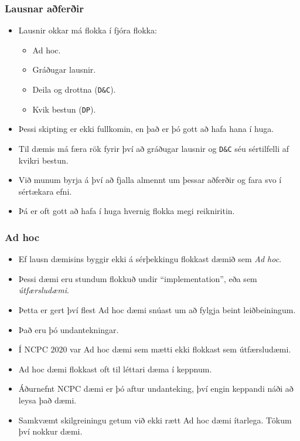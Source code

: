\documentclass{beamer}
\newcommand\env[2]
{
	\begin{#1}
	#2
	\end{#1}
}
\begin{document}
\env{frame}
{
	\frametitle{Lausnar aðferðir}
	\env{itemize}
	{
		\item<1-> Lausnir okkar má flokka í fjóra flokka:
		\env{itemize}
		{
			\item<2-> Ad hoc.
			\item<3-> Gráðugar lausnir.
			\item<4-> Deila og drottna (\texttt{D\&C}).
			\item<5-> Kvik bestun (\texttt{DP}).
		}
		\item<6-> Þessi skipting er ekki fullkomin, en það er þó gott að hafa hana í huga.
		\item<7-> Til dæmis má færa rök fyrir því að gráðugar lausnir og \texttt{D\&C} séu sértilfelli af kvikri bestun.
		\item<8-> Við munum byrja á því að fjalla almennt um þessar aðferðir og fara svo í sértækara efni.
		\item<9-> Þá er oft gott að hafa í huga hvernig flokka megi reikniritin.
	}
}

\env{frame}
{
	\frametitle{Ad hoc}
	\env{itemize}
	{
		\item<1-> Ef lausn dæmisins byggir ekki á sérþekkingu flokkast dæmið sem \emph{Ad hoc}.
		\item<2-> Þessi dæmi eru stundum flokkuð undir ``implementation'', eða sem \emph{útfærsludæmi}.
		\item<3-> Þetta er gert því flest Ad hoc dæmi snúast um að fylgja beint leiðbeiningum.
		\item<4-> Það eru þó undantekningar.
		\item<5-> Í NCPC $2020$ var Ad hoc dæmi sem mætti ekki flokkast sem útfærsludæmi.
		\item<6-> Ad hoc dæmi flokkast oft til léttari dæma í keppnum.
		\item<7-> Áðurnefnt NCPC dæmi er þó aftur undanteking, því engin keppandi náði að leysa það dæmi.
		\item<8-> Samkvæmt skilgreiningu getum við ekki rætt Ad hoc dæmi ítarlega. Tökum því nokkur dæmi.
	}
}
\end{document}
